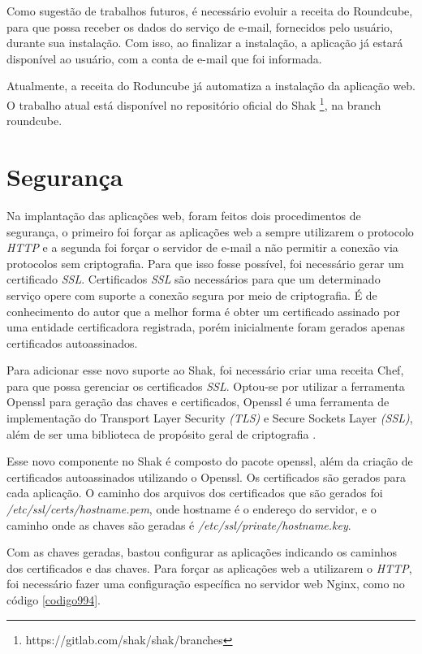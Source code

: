 Como sugestão de trabalhos futuros, é necessário evoluir a receita do Roundcube, 
para que possa receber os dados do serviço de e-mail, fornecidos pelo usuário, 
durante sua instalação. Com isso, ao finalizar a instalação, a aplicação já 
estará disponível ao usuário, com a conta de e-mail que foi informada.

Atualmente, a receita do Roduncube já automatiza a instalação da aplicação web. 
O trabalho atual está disponível no repositório oficial do Shak \footnote{https://gitlab.com/shak/shak/branches}, na branch roundcube.

\section{Segurança}
\label{sub:seguranca}

Na implantação das aplicações web, foram feitos dois procedimentos de segurança, o primeiro
foi forçar as aplicações web a sempre utilizarem o protocolo \textit{HTTP} e a segunda foi forçar o
servidor de e-mail a não permitir a conexão via protocolos sem criptografia. Para que 
isso fosse possível, foi necessário gerar um certificado \textit{SSL}. Certificados 
\textit{SSL} são necessários para que um determinado serviço opere com suporte 
a conexão segura por meio de criptografia.
É de conhecimento do autor que a melhor forma é obter um certificado assinado
por uma entidade certificadora registrada, porém inicialmente foram gerados apenas certificados
autoassinados.

Para adicionar esse novo suporte ao Shak, foi necessário criar uma receita Chef,
para que possa gerenciar os certificados \textit{SSL}. Optou-se por utilizar a ferramenta
Openssl para geração das chaves e certificados, Openssl é uma ferramenta de
implementação do Transport Layer Security \textit{(TLS)} e Secure Sockets Layer \textit{(SSL)},
além de ser uma biblioteca de propósito geral de criptografia \cite{openssl}.

Esse novo componente no Shak é composto do pacote openssl, além da criação
de certificados autoassinados utilizando o Openssl. Os certificados são gerados 
para cada aplicação. O caminho dos arquivos dos certificados que 
são gerados foi \textit{/etc/ssl/certs/hostname.pem}, onde hostname é o endereço 
do servidor,
e o caminho onde as chaves são geradas é \textit{/etc/ssl/private/hostname.key}.

Com as chaves geradas, bastou configurar as aplicações indicando os caminhos dos certificados
e das chaves. Para forçar as aplicações web a utilizarem o \textit{HTTP}, foi necessário fazer
uma configuração específica no servidor web Nginx, como no código \ref{codigo994}.

